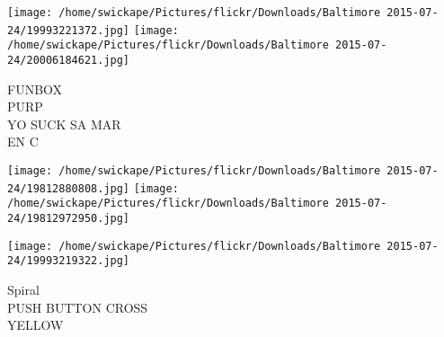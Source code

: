\documentclass[10pt,letterpaper]{article}
\begin{document}
\texttt{[image: /home/swickape/Pictures/flickr/Downloads/Baltimore 2015-07-24/19993221372.jpg]}
\texttt{[image: /home/swickape/Pictures/flickr/Downloads/Baltimore 2015-07-24/20006184621.jpg]}

FUNBOX\\
PURP\\
YO SUCK SA MAR\\
EN C\\
\pagebreak

\texttt{[image: /home/swickape/Pictures/flickr/Downloads/Baltimore 2015-07-24/19812880808.jpg]}
\texttt{[image: /home/swickape/Pictures/flickr/Downloads/Baltimore 2015-07-24/19812972950.jpg]}

\vspace{0.25in}
\texttt{[image: /home/swickape/Pictures/flickr/Downloads/Baltimore 2015-07-24/19993219322.jpg]}

Spiral\\
PUSH BUTTON CROSS\\
YELLOW\\
\pagebreak
\end{document}

